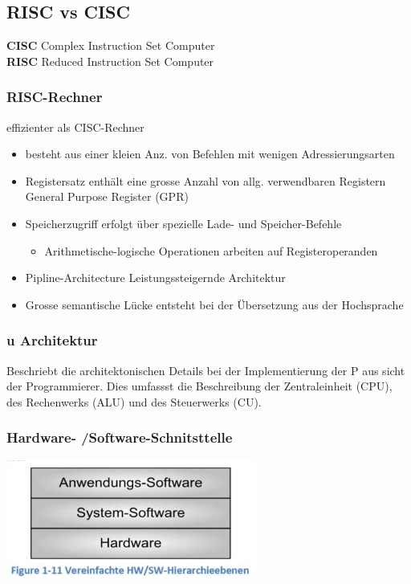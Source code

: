 \subsection{RISC vs CISC}
\begin{multicols}{2}
    \textbf{CISC}\newline
    Complex Instruction Set Computer
    \\
    \textbf{RISC}\newline
    Reduced Instruction Set Computer
\end{multicols}
\subsubsection{RISC-Rechner}
effizienter als CISC-Rechner
\begin{itemize}
    \item besteht aus einer kleien Anz. von Befehlen mit wenigen Adressierungsarten
    \item Registersatz enthält eine grosse Anzahl von allg. verwendbaren Registern\newline
    General Purpose Register (GPR)
    \item Speicherzugriff erfolgt über spezielle Lade- und Speicher-Befehle
    \begin{itemize}
        \item Arithmetische-logische Operationen arbeiten auf Registeroperanden
    \end{itemize}
    \item Pipline-Architecture \leftarrow Leistungssteigernde Architektur
    \item Grosse semantische Lücke entsteht bei der Übersetzung aus der Hochsprache
\end{itemize}

\subsubsection{u Architektur}
Beschriebt die architektonischen Details bei der Implementierung der \mu P aus sicht der Programmierer.
Dies umfassst die Beschreibung der Zentraleinheit (CPU), des Rechenwerks (ALU) und des Steuerwerks (CU).

\subsubsection{Hardware- /Software-Schnitsttelle}
\includegraphics{images/HardwareSoftware}

